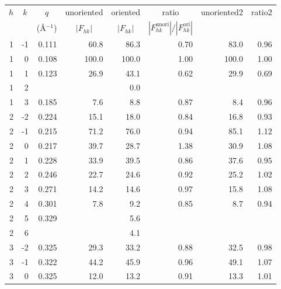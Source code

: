 \begin{table}[htbp]
  \centering
  \begin{tabular}{rrrrrrrr}
    \hline
    \multicolumn{1}{c}{$h$} & \multicolumn{1}{c}{$k$} & \multicolumn{1}{c}{$q$} & \multicolumn{1}{c}{unoriented} & \multicolumn{1}{c}{oriented} & \multicolumn{1}{c}{ratio} & \multicolumn{1}{c}{unoriented2} & \multicolumn{1}{c}{ratio2} \\
     & & \multicolumn{1}{c}{(\AA$^{-1}$)} & \multicolumn{1}{c}{$|F_{hk}|$} & \multicolumn{1}{c}{$|F_{hk}|$} & \multicolumn{1}{c}{$\left|F_{hk}^\text{unori}\right|/\left|F_{hk}^\text{ori}\right|$}\\
    \hline
    1 & -1 & {\color{red}0.111}   & 60.8  & 86.3  & 0.70 & 83.0  & 0.96 \\
    1 &  0 & {\color{red}0.108}   & 100.0 & 100.0 & 1.00 & 100.0 & 1.00 \\
    1 &  1 & 0.123                & 26.9  & 43.1  & 0.62 & 29.9  & 0.69 \\
    1 &  2 &                      &       & 0.0   &      &       &      \\
    1 &	 3 & 0.185                & 7.6   & 8.8   & 0.87 & 8.4   & 0.96 \\
    2 &	-2 & 0.224                & 15.1  & 18.0  & 0.84 & 16.8  & 0.93 \\
    2 &	-1 & {\color{blue}0.215}  & 71.2  & 76.0  & 0.94 & 85.1  & 1.12 \\
    2 &  0 & {\color{blue}0.217}  & 39.7  & 28.7  & 1.38 & 30.9  & 1.08 \\
    2 &	 1 & 0.228                & 33.9  & 39.5  & 0.86 & 37.6  & 0.95 \\
    2 &  2 & 0.246                & 22.7  & 24.6  & 0.92 & 25.2  & 1.02 \\
    2 &	 3 & 0.271                & 14.2  & 14.6  & 0.97 & 15.8  & 1.08 \\
    2 &  4 & 0.301                & 7.8   & 9.2   & 0.85 & 8.7   & 0.94 \\
    2 &  5 & 0.329                &       & 5.6   &      &       &      \\
    2 &  6 &                      &       & 4.1   &      &       &      \\
	  3 &	-2 & {\color{green}0.325} & 29.3  & 33.2  & 0.88 & 32.5  & 0.98 \\
    3 & -1 & 0.322                & 44.2  & 45.9  & 0.96 & 49.1  & 1.07 \\
    3 &  0 & {\color{green}0.325} & 12.0  & 13.2  & 0.91 & 13.3  & 1.01 \\

\end{tabular}
\end{table}
